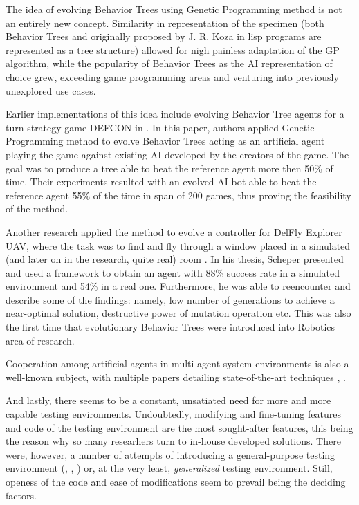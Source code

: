 The idea of evolving Behavior Trees using Genetic Programming method is not an entirely new concept. Similarity in representation of the specimen (both Behavior Trees and originally proposed by J. R. Koza in \cite{kozagp} lisp programs are represented as a tree structure) allowed for nigh painless adaptation of the GP algorithm, while the popularity of Behavior Trees as the AI representation of choice grew, exceeding game programming areas and venturing into previously unexplored use cases.

Earlier implementations of this idea include evolving Behavior Tree agents for a turn strategy game DEFCON in \cite{defconbt}. In this paper, authors applied Genetic Programming method to evolve Behavior Trees acting as an artificial agent playing the game against existing AI developed by the creators of the game. The goal was to produce a tree able to beat the reference agent more then 50\% of time. Their experiments resulted with an evolved AI-bot able to beat the reference agent 55\% of the time in span of 200 games, thus proving the feasibility of the method.

Another research applied the method to evolve a controller for DelFly Explorer UAV, where the task was to find and fly through a window placed in a simulated (and later on in the research, quite real) room \cite{ksheperthesis}. In his thesis, Scheper presented and used a framework to obtain an agent with 88\% success rate in a simulated environment and 54\% in a real one. Furthermore, he was able to reencounter and describe some of the \cite{defconbt} findings: namely, low number of generations to achieve a near-optimal solution, destructive power of mutation operation etc. This was also the first time that evolutionary Behavior Trees were introduced into Robotics area of research.

Cooperation among artificial agents in multi-agent system environments is also a well-known subject, with multiple papers detailing state-of-the-art techniques \cite{cooperationstateoftheart}, \cite{cooperativeandcompetitivelearning}.

And lastly, there seems to be a constant, unsatiated need for more and more capable testing environments. Undoubtedly, modifying and fine-tuning features and code of the testing environment are the most sought-after features, this being the reason why so many researhers turn to in-house developed solutions. There were, however, a number of attempts of introducing a general-purpose testing environment (\cite{mason}, \cite{aisandbox}, \cite{frailweb}) or, at the very least, \textit{generalized} testing environment. Still, openess of the code and ease of modifications seem to prevail being the deciding factors. %
